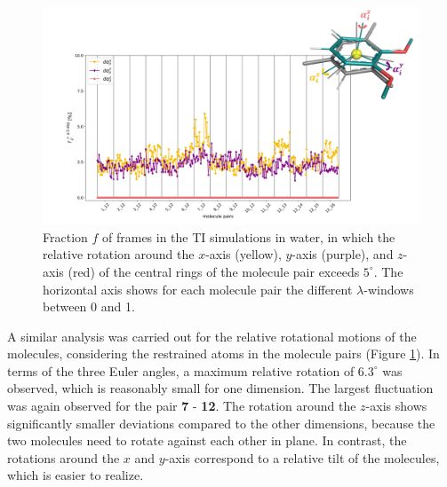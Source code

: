 \begin{figure}[h!]
    \centering
    \includegraphics[width=\textwidth]{fig/results/pairwise/sampling/TI_pairwise_molecule_rotation.png}
    \caption{Fraction $f$ of frames in the TI simulations in water, in which the relative rotation around the $x$-axis (yellow), $y$-axis (purple), and $z$-axis (red) of the central rings of the molecule pair exceeds $5^{\circ}$. The horizontal axis shows for each molecule pair the different $\lambda$-windows between 0 and 1.}
    \label{fig: pairMolRotation_TIStarMap}
\end{figure}

A similar analysis was carried out for the relative rotational motions of the molecules, considering the restrained atoms in the molecule pairs (Figure \ref{fig: pairMolRotation_TIStarMap}). In terms of the three Euler angles, a maximum relative rotation of $6.3^\circ$ was observed, which is reasonably small for one dimension. The largest fluctuation was again observed for the pair \textbf{7} - \textbf{12}. The rotation around the $z$-axis shows significantly smaller deviations compared to the other dimensions, because the two molecules need to rotate against each other in plane. In contrast, the rotations around the $x$ and $y$-axis correspond to a relative tilt of the molecules, which is easier to realize. 
 
 \FloatBarrier
 

